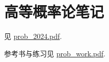 \section{高等概率论笔记}

见 \href{https://www.huarui1998.com/Notes/math/prob_2024.pdf}{prob\_2024.pdf}.

参考书与练习见 \href{http://scholar.pku.edu.cn/sites/default/files/lity/files/prob_work.pdf}{prob\_work.pdf}.

